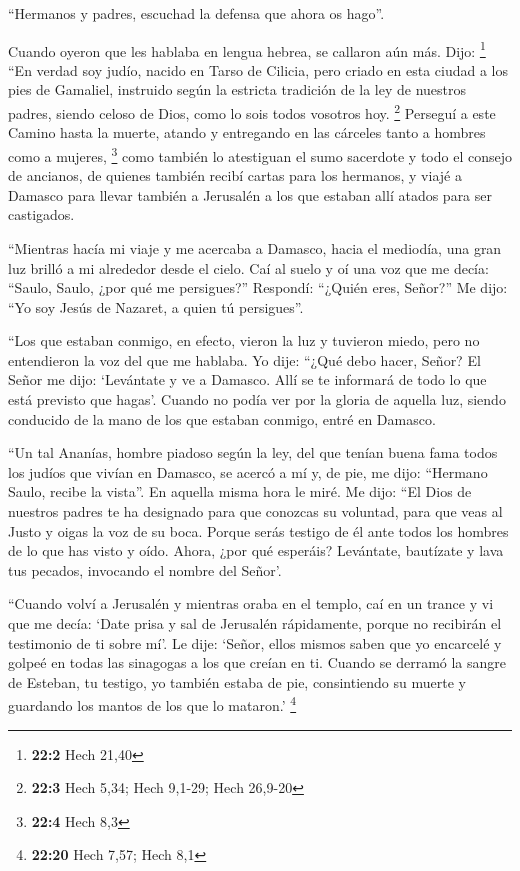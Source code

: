 \begin{paracol}{2}
 ``Hermanos y padres, escuchad la defensa que ahora os
hago''.

 Cuando oyeron que les hablaba en lengua hebrea, se
callaron aún más. Dijo: \footnote{\textbf{22:2} Hech 21,40}
 ``En verdad soy judío, nacido en Tarso de Cilicia, pero
criado en esta ciudad a los pies de Gamaliel, instruido según la
estricta tradición de la ley de nuestros padres, siendo celoso de Dios,
como lo sois todos vosotros hoy. \footnote{\textbf{22:3} Hech 5,34; Hech
  9,1-29; Hech 26,9-20}  Perseguí a este Camino hasta la
muerte, atando y entregando en las cárceles tanto a hombres como a
mujeres, \footnote{\textbf{22:4} Hech 8,3}  como también
lo atestiguan el sumo sacerdote y todo el consejo de ancianos, de
quienes también recibí cartas para los hermanos, y viajé a Damasco para
llevar también a Jerusalén a los que estaban allí atados para ser
castigados.

 ``Mientras hacía mi viaje y me acercaba a Damasco, hacia
el mediodía, una gran luz brilló a mi alrededor desde el cielo.
 Caí al suelo y oí una voz que me decía: ``Saulo, Saulo,
¿por qué me persigues?''  Respondí: ``¿Quién eres,
Señor?'' Me dijo: ``Yo soy Jesús de Nazaret, a quien tú persigues''.

 ``Los que estaban conmigo, en efecto, vieron la luz y
tuvieron miedo, pero no entendieron la voz del que me hablaba.
 Yo dije: ``¿Qué debo hacer, Señor? El Señor me dijo:
`Levántate y ve a Damasco. Allí se te informará de todo lo que está
previsto que hagas'.  Cuando no podía ver por la gloria
de aquella luz, siendo conducido de la mano de los que estaban conmigo,
entré en Damasco.

 ``Un tal Ananías, hombre piadoso según la ley, del que
tenían buena fama todos los judíos que vivían en Damasco,
 se acercó a mí y, de pie, me dijo: ``Hermano Saulo,
recibe la vista''. En aquella misma hora le miré.  Me
dijo: ``El Dios de nuestros padres te ha designado para que conozcas su
voluntad, para que veas al Justo y oigas la voz de su boca.
 Porque serás testigo de él ante todos los hombres de lo
que has visto y oído.  Ahora, ¿por qué esperáis?
Levántate, bautízate y lava tus pecados, invocando el nombre del Señor'.

 ``Cuando volví a Jerusalén y mientras oraba en el
templo, caí en un trance  y vi que me decía: `Date prisa
y sal de Jerusalén rápidamente, porque no recibirán el testimonio de ti
sobre mí'.  Le dije: `Señor, ellos mismos saben que yo
encarcelé y golpeé en todas las sinagogas a los que creían en ti.
 Cuando se derramó la sangre de Esteban, tu testigo, yo
también estaba de pie, consintiendo su muerte y guardando los mantos de
los que lo mataron.' \footnote{\textbf{22:20} Hech 7,57; Hech 8,1}


\end{paracol}
